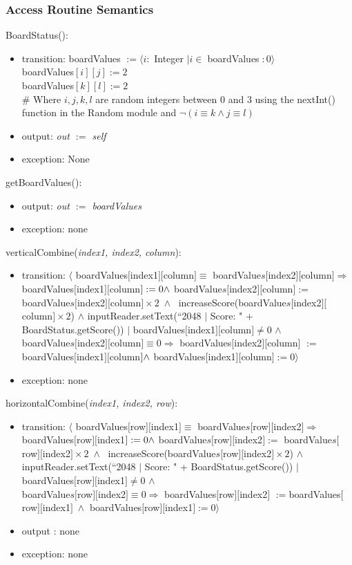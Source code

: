 \documentclass{article}
\begin{document}
\subsubsection*{Access Routine Semantics}
BoardStatus():
\begin{itemize}
    \item transition: boardValues $:= \langle i :$ Integer $ | i \in \;$boardValues$\; : 0 \rangle$
    \\ boardValues$[i][j] := 2$ \\
    boardValues$[k][l] := 2$ \\\# Where $i, j, k, l$ are random integers between $0$ and $3$ using the nextInt() function in the Random module and $\neg(i \equiv k \land j \equiv l)$
    \item output: \textit{out $:=$ self}
    \item exception: None
\end{itemize}
getBoardValues():
\begin{itemize}
    \item output: \textit{out $:=$ boardValues}
    \item exception: none
\end{itemize}
verticalCombine(\textit{index1, index2, column}):
\begin{itemize}
    \item transition: $\langle$ boardValues$[$index1$][$column$] \equiv $ boardValue$s[$index2$][$column$] \Rightarrow$ boardValues$[$index1$][$column$] := 0 \\ \land$ boardValue$s[$index2$][$column$] :=$ boardValue$s[$index2$][$column$] \times 2 \; \land \;$ increaseScore(boardValue$s[$index2$][$column$] \times 2$) $\land$ inputReader.setText(``2048 $|$ Score: " +  BoardStatus.getScore()) $|$ boardValues$[$index1$][$column$] \neq 0$ $\land $ \\ boardValue$s[$index2$][$column$] \equiv 0 \Rightarrow$ boardValues$[$index2$][$column$]$ $:= $boardValues$[$index1$][$column$]\; \\ \land$ boardValues$[$index1$][$column$] := 0 \rangle$
    \item exception: none
\end{itemize}
horizontalCombine(\textit{index1, index2, row}):
\begin{itemize}
    \item transition: $\langle$ boardValues$[$row$][$index1$] \equiv $ boardValue$s[$row$][$index2$] \Rightarrow$ boardValues$[$row$][$index1$] := 0 \\ \land$ boardValue$s[$row$][$index2$] :=$ boardValue$s[$row$][$index2$] \times 2 \; \land \;$ increaseScore(boardValue$s[$row$][$index2$] \times 2$) $\land$ \\ inputReader.setText(``2048 $|$ Score: " +  BoardStatus.getScore()) $|$ boardValues$[$row$][$index1$] \neq 0$ $\land $ \\ boardValue$s[$row$][$index2$] \equiv 0 \Rightarrow$ boardValues$[$row$][$index2$]$ $:= $boardValues$[$row$][$index1$]\; \land$ boardValues$[$row$][$index1$] := 0 \rangle$
    \item output : none
    \item exception: none
\end{itemize}
\end{document}
